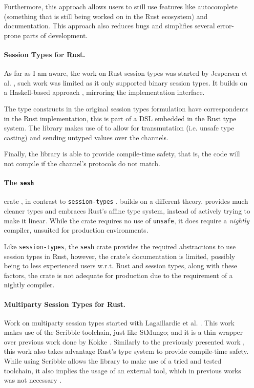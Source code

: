 Furthermore, this approach allows users to still use features like autocomplete
(something that is still being worked on in the Rust ecosystem) and documentation.
This approach also reduces bugs and simplifies several error-prone parts of development.

\paragraph{Session Types for Rust.}
As far as I am aware, the work on Rust session types was started by Jespersen et al. \autocite{Jespersen2015},
such work was limited as it only supported binary session types.
It builds on a Haskell-based approach \autocite{Pucella2008}, mirroring the implementation interface.

The type constructs in the original session types formulation have correspondents in the Rust implementation,
this is part of a DSL embedded in the Rust type system.
The library makes use of  to allow for transmutation (i.e. unsafe type casting)
and sending untyped values over the channels.

Finally, the library is able to provide compile-time safety, that is,
the code will not compile if the channel's protocols do not match.

\paragraph{The \texttt{sesh}} crate \cite{Kokke2019}, in contrast to \texttt{session-types} \autocite{Jespersen2015},
builds on a different theory, provides much cleaner types and embraces Rust's affine type system,
instead of actively trying to make it linear.
While the crate requires no use of \texttt{unsafe}, it does require a \emph{nightly} compiler,
unsuited for production environments.

Like \texttt{session-types}, the \texttt{sesh} crate provides the required abstractions to use session types in Rust,
however, the crate's documentation is limited, possibly being  to less experienced users
w.r.t. Rust and session types, along with these factors,
the crate is not adequate for production due to the requirement of a nightly compiler.

\paragraph{Multiparty Session Types for Rust.}
Work on multiparty session types started with Lagaillardie et al. \autocite{Lagaillardie2020}.
This work makes use of the Scribble \autocite{Yoshida2014} toolchain, just like StMungo;
and it is a thin wrapper over previous work done by Kokke \autocite{Kokke2019}.
Similarly to the previously presented work \autocite{Jespersen2015},
this work also takes advantage Rust's type system to provide compile-time safety.
While using Scribble allows the library to make use of a tried and tested toolchain,
it also implies the usage of an external tool, which in previous works was not necessary \autocite{Jespersen2015, Kokke2019}.


